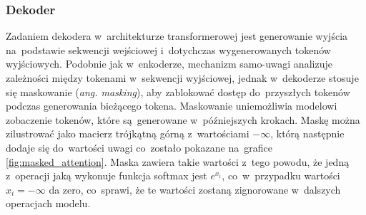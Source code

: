 \documentclass[data-science]{agh-wi} %
\begin{document}
\subsubsection*{Dekoder}
Zadaniem dekodera w~architekturze transformerowej jest generowanie wyjścia na~podstawie sekwencji wejściowej i~dotychczas wygenerowanych tokenów wyjściowych. Podobnie jak w~enkoderze, mechanizm samo-uwagi analizuje zależności między tokenami w~sekwencji wyjściowej, jednak w~dekoderze stosuje się maskowanie (\textit{ang. masking}), aby zablokować dostęp do~przyszłych tokenów podczas generowania bieżącego tokena. Maskowanie uniemożliwia modelowi zobaczenie tokenów, które są~generowane w~późniejszych krokach. Maskę można zilustrować jako macierz trójkątną górną z~wartościami $-\infty$, którą następnie dodaje się do~wartości uwagi co~zostało pokazane na~grafice \ref*{fig:masked_attention}. Maska zawiera takie wartości z~tego powodu, że jedną z~operacji jaką wykonuje funkcja softmax jest $e^{x_i}$, co~w~przypadku wartości $x_i = -\infty$ da zero, co~sprawi, że te wartości zostaną zignorowane w~dalszych operacjach modelu.
\end{document}
